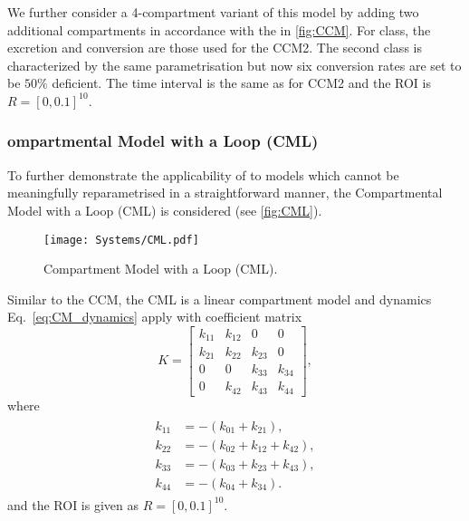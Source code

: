 We further consider a 4-compartment variant of this model by adding two additional compartments in accordance with the  in \autoref{fig:CCM}.
For  class, the excretion and conversion are  those used for the CCM2.
The second class is characterized by the same parametrisation but now six  conversion rates are set to be $50 \%$ deficient.
The  time interval is the same as for CCM2 and the ROI is $R = [0, 0.1]^{10}$.

\subsubsection{ompartmental Model with a Loop (CML)}
To further demonstrate the applicability of \myMethod{} to models which cannot be meaningfully reparametrised in a straightforward manner, the Compartmental Model with a Loop (CML) is considered (see \autoref{fig:CML}). 
\begin{figure}[t!]
    \centering
    \texttt{[image: Systems/CML.pdf]}
    \caption{Compartment Model with a Loop (CML).}
    \label{fig:CML}
\end{figure}
Similar to the CCM, the CML is a linear compartment model and dynamics Eq.~\eqref{eq:CM_dynamics} apply with coefficient matrix
\begin{equation}
    K = 
    \begin{bmatrix}
        k_{11} & k_{12} &        0 & 0      \\
        k_{21} & k_{22} &   k_{23} & 0      \\
            0  &      0 &   k_{33} & k_{34} \\
            0  & k_{42} &   k_{43} & k_{44}
    \end{bmatrix},
\end{equation}
where 
\begin{align}
    \begin{split}
        k_{11} &= -(k_{01} + k_{21}), \\
        k_{22} &= -(k_{02} + k_{12} + k_{42}), \\
        k_{33} &= -(k_{03} + k_{23} + k_{43}), \\
        k_{44} &= -(k_{04} + k_{34}).
    \end{split}
\end{align}
and the ROI is given as $R = [0, 0.1]^{10}$. 

